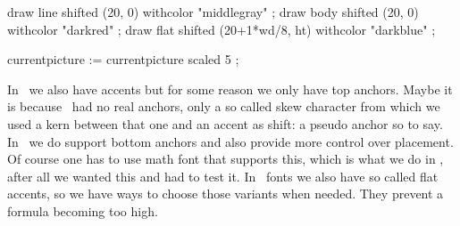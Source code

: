     draw line shifted (20, 0)         withcolor "middlegray" ;
    draw body shifted (20, 0)         withcolor "darkred" ;
    draw flat shifted (20+1*wd/8, ht) withcolor "darkblue" ;

    currentpicture := currentpicture scaled 5 ;
\stopMPcode
\stoplinecorrection

In \OPENTYPE\ we also have accents but for some reason we only have top anchors.
Maybe it is because \TEX\ had no real anchors, only a so called skew character
from which we used a kern between that one and an accent as shift: a pseudo
anchor so to say. In \LUAMETATEX\ we do support bottom anchors and also provide
more control over placement. Of course one has to use math font that supports
this, which is what we do in \CONTEXT, after all we wanted this and had to test
it. In \OPENTYPE\ fonts we also have so called flat accents, so we have ways to
choose those variants when needed. They prevent a formula becoming too high.

\startbuffer[1]
\stopbuffer

\startbuffer[21]
\stopbuffer

\startbuffer[22]
\stopbuffer

\startbuffer[3]
\stopbuffer

\startbuffer[4]
\stopbuffer

